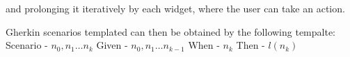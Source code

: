 and prolonging it iteratively by each widget, where the user can take an action.

Gherkin scenarios templated can then be obtained by the following tempalte:
Scenario - $n_0,n_1 \ldots n_k$
Given - $n_0, n_1 \ldots n_{k-1}$
When - $n_k$
Then - $l(n_k)$










